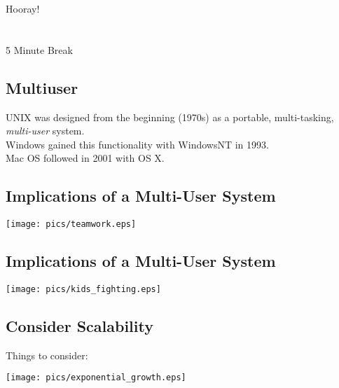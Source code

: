 \documentclass[xga]{xdvislides}
\begin{document}
\newpage
\vspace*{\fill}
\begin{center}
    \Hugesize
        Hooray! \\ [1em]
    \hspace*{5mm}
    \blueline\\
    \hspace*{5mm}\\
        5 Minute Break
\end{center}
\vspace*{\fill}

\subsection{Multiuser}

UNIX was designed from the beginning (1970s) as a portable, multi-tasking,
{\em multi-user} system. \\

Windows gained this functionality with WindowsNT in 1993. \\

Mac OS followed in 2001 with OS X.

\subsection{Implications of a Multi-User System}
\vspace*{\fill}
\begin{center}
	\texttt{[image: pics/teamwork.eps]}
\end{center}
\vspace*{\fill}

\subsection{Implications of a Multi-User System}
\vspace*{\fill}
\begin{center}
	\texttt{[image: pics/kids\_fighting.eps]}
\end{center}
\vspace*{\fill}

\subsection{Consider Scalability}
Things to consider:
\\

\begin{center}
	\texttt{[image: pics/exponential\_growth.eps]}
\end{center}
\end{document}
